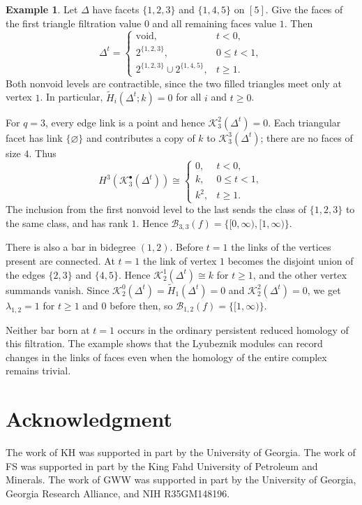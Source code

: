 \documentclass[11pt]{article}
\theoremstyle{plain}
\theoremstyle{definition}
\newtheorem{example}[theorem]{Example}
\newcommand{\kk}{k}
\newcommand{\rH}{\widetilde{H}}
\newcommand{\Kc}{\mathcal K}
\begin{document}
\begin{example}\label{ex:additional-lyubeznik-bars}
Let $\Delta$ have facets $\{1,2,3\}$ and $\{1,4,5\}$ on $[5]$. Give the faces of the first triangle filtration value $0$ and all remaining faces value $1$. Then
\[
\Delta^t=\begin{cases}
\text{void},&t<0,\\
2^{\{1,2,3\}},&0\le t<1,\\
2^{\{1,2,3\}}\cup2^{\{1,4,5\}},&t\ge1.
\end{cases}
\]
Both nonvoid levels are contractible, since the two filled triangles meet only at vertex $1$. In particular, $\rH_i(\Delta^t;\kk)=0$ for all $i$ and $t\ge0$.

For $q=3$, every edge link is a point and hence $\Kc_3^2(\Delta^t)=0$. Each triangular facet has link $\{\varnothing\}$ and contributes a copy of $\kk$ to $\Kc_3^3(\Delta^t)$; there are no faces of size $4$. Thus
\[
H^3(\Kc_3^\bullet(\Delta^t))\cong\begin{cases}
0,&t<0,\\
\kk,&0\le t<1,\\
\kk^2,&t\ge1.
\end{cases}
\]
The inclusion from the first nonvoid level to the last sends the class of $\{1,2,3\}$ to the same class, and has rank $1$. Hence $\mathcal B_{3,3}(f)=\{[0,\infty),[1,\infty)\}$.

There is also a bar in bidegree $(1,2)$. Before $t=1$ the links of the vertices present are connected. At $t=1$ the link of vertex $1$ becomes the disjoint union of the edges $\{2,3\}$ and $\{4,5\}$. Hence $\Kc_2^1(\Delta^t)\cong\kk$ for $t\ge1$, and the other vertex summands vanish. Since $\Kc_2^0(\Delta^t)=\rH_1(\Delta^t)=0$ and $\Kc_2^2(\Delta^t)=0$, we get $\lambda_{1,2}=1$ for $t\ge1$ and $0$ before then, so $\mathcal B_{1,2}(f)=\{[1,\infty)\}$.

Neither bar born at $t=1$ occurs in the ordinary persistent reduced homology of this filtration. The example shows that the Lyubeznik modules can record changes in the links of faces even when the homology of the entire complex remains trivial.
\end{example}


\section*{Acknowledgment}

The work of KH was supported in part by the University of Georgia. 
The work of FS was supported in part by the King Fahd University of Petroleum and Minerals. 
The work of GWW was supported in part by the University of Georgia, Georgia Research Alliance, and   NIH R35GM148196. 
\end{document}
